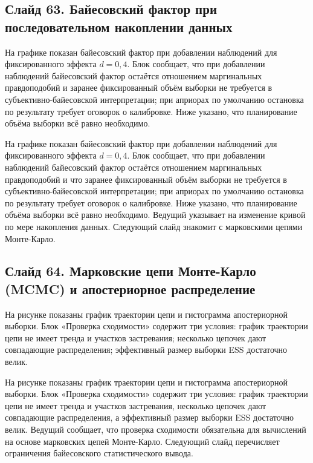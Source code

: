 \documentclass[11pt,a4paper]{article}
\begin{document}
\subsection*{Слайд 63. Байесовский фактор при последовательном накоплении данных}
\begin{onslide}
На графике показан байесовский фактор при добавлении наблюдений для фиксированного эффекта $d = 0{,}4$. Блок сообщает, что при добавлении наблюдений байесовский фактор остаётся отношением маргинальных правдоподобий и заранее фиксированный объём выборки не требуется в субъективно-байесовской интерпретации; при априорах по умолчанию остановка по результату требует оговорок о калибровке. Ниже указано, что планирование объёма выборки всё равно необходимо.
\end{onslide}
На графике показан байесовский фактор при добавлении наблюдений для фиксированного эффекта $d = 0{,}4$. Блок сообщает, что при добавлении наблюдений байесовский фактор остаётся отношением маргинальных правдоподобий и что заранее фиксированный объём выборки не требуется в субъективно-байесовской интерпретации; при априорах по умолчанию остановка по результату требует оговорок о калибровке. Ниже указано, что планирование объёма выборки всё равно необходимо. Ведущий указывает на изменение кривой по мере накопления данных. Следующий слайд знакомит с марковскими цепями Монте-Карло.

\subsection*{Слайд 64. Марковские цепи Монте-Карло (MCMC) и апостериорное распределение}
\begin{onslide}
На рисунке показаны график траектории цепи и гистограмма апостериорной выборки. Блок «Проверка сходимости» содержит три условия: график траектории цепи не имеет тренда и участков застревания; несколько цепочек дают совпадающие распределения; эффективный размер выборки ESS достаточно велик.
\end{onslide}
На рисунке показаны график траектории цепи и гистограмма апостериорной выборки. Блок «Проверка сходимости» содержит три условия: график траектории цепи не имеет тренда и участков застревания, несколько цепочек дают совпадающие распределения, а эффективный размер выборки ESS достаточно велик. Ведущий сообщает, что проверка сходимости обязательна для вычислений на основе марковских цепей Монте-Карло. Следующий слайд перечисляет ограничения байесовского статистического вывода.
\end{document}
